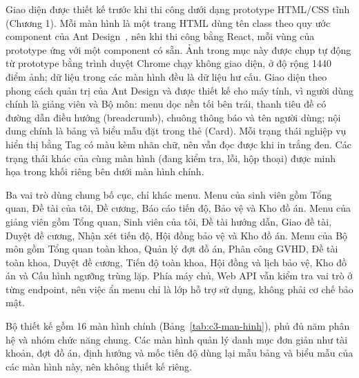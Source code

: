 \documentclass[../main.tex]{subfiles}
\begin{document}
Giao diện được thiết kế trước khi thi công dưới dạng prototype HTML/CSS tĩnh (Chương 1). Mỗi màn hình là một trang HTML dùng tên class theo quy ước component của Ant Design~\cite{antd}, nên khi thi công bằng React, mỗi vùng của prototype ứng với một component có sẵn. Ảnh trong mục này được chụp tự động từ prototype bằng trình duyệt Chrome chạy không giao diện, ở độ rộng 1440 điểm ảnh; dữ liệu trong các màn hình đều là dữ liệu hư cấu. Giao diện theo phong cách quản trị của Ant Design và được thiết kế cho máy tính, vì người dùng chính là giảng viên và Bộ môn: menu dọc nền tối bên trái, thanh tiêu đề có đường dẫn điều hướng (breadcrumb), chuông thông báo và tên người dùng; nội dung chính là bảng và biểu mẫu đặt trong thẻ (Card). Mỗi trạng thái nghiệp vụ hiển thị bằng Tag có màu kèm nhãn chữ, nên vẫn đọc được khi in trắng đen. Các trạng thái khác của cùng màn hình (đang kiểm tra, lỗi, hộp thoại) được minh họa trong khối riêng bên dưới màn hình chính.

Ba vai trò dùng chung bố cục, chỉ khác menu. Menu của sinh viên gồm Tổng quan, Đề tài của tôi, Đề cương, Báo cáo tiến độ, Bảo vệ và Kho đồ án. Menu của giảng viên gồm Tổng quan, Sinh viên của tôi, Đề tài hướng dẫn, Giao đề tài, Duyệt đề cương, Nhận xét tiến độ, Hội đồng bảo vệ và Kho đồ án. Menu của Bộ môn gồm Tổng quan toàn khoa, Quản lý đợt đồ án, Phân công GVHD, Đề tài toàn khoa, Duyệt đề cương, Tiến độ toàn khoa, Hội đồng và lịch bảo vệ, Kho đồ án và Cấu hình ngưỡng trùng lặp. Phía máy chủ, Web API vẫn kiểm tra vai trò ở từng endpoint, nên việc ẩn menu chỉ là lớp hỗ trợ sử dụng, không phải cơ chế bảo mật.

Bộ thiết kế gồm 16 màn hình chính (Bảng~\ref{tab:c3-man-hinh}), phủ đủ năm phân hệ và nhóm chức năng chung. Các màn hình quản lý danh mục đơn giản như tài khoản, đợt đồ án, định hướng và mốc tiến độ dùng lại mẫu bảng và biểu mẫu của các màn hình này, nên không thiết kế riêng.
\end{document}

